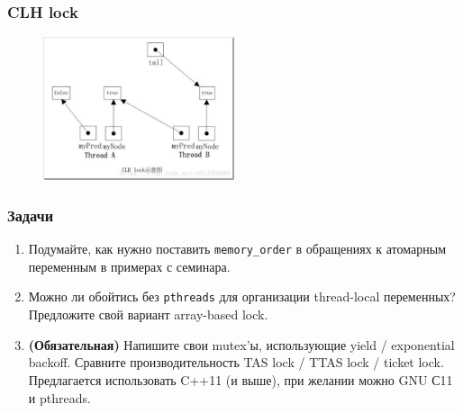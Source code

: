\documentclass[aspectratio=169, pdf, 8pt, unicode]{beamer}
\begin{document}
\begin{frame}[fragile]
\frametitle{CLH lock}
\begin{figure}[H]
\includegraphics[width=0.5\textwidth]{fig/clh.jpeg}
\end{figure}
\end{frame}

\begin{frame}
\frametitle{Задачи}
\begin{enumerate}
\item Подумайте, как нужно поставить \texttt{memory\_order} в обращениях к атомарным переменным в примерах с семинара.
\item Можно ли обойтись без \texttt{pthreads} для организации thread-local переменных? Предложите свой вариант array-based lock.
\item \textbf{(Обязательная)} Напишите свои mutex'ы, использующие yield / exponential backoff.
    Сравните производительность TAS lock / TTAS lock / ticket lock.
    Предлагается использовать C++11 (и выше), при желании можно GNU С11 и pthreads.
\end{enumerate}

\end{frame}
\end{document}
